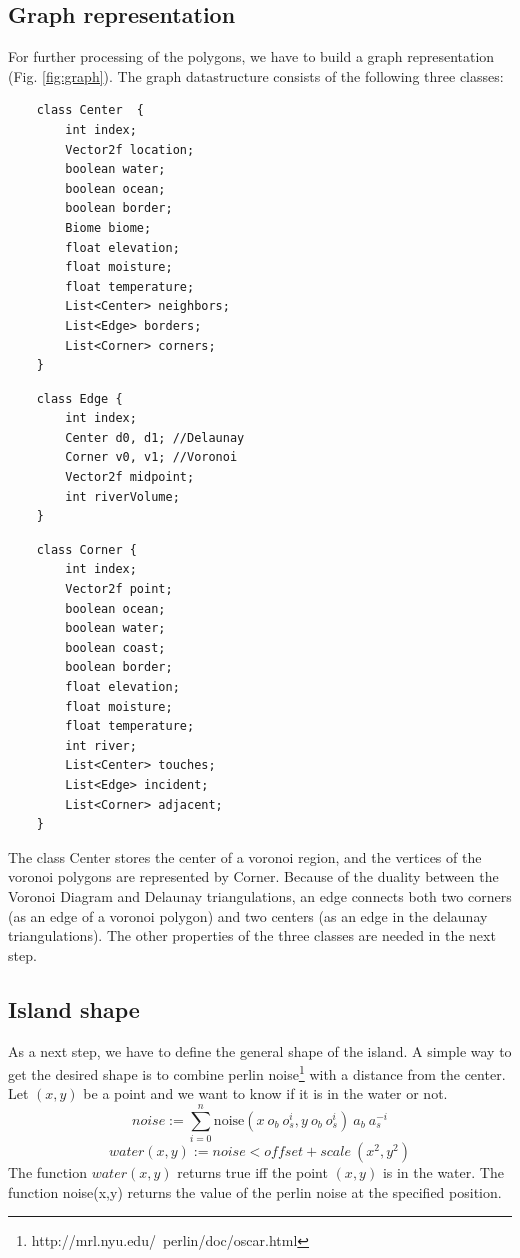 \documentclass[journal, letterpaper]{IEEEtran}
\begin{document}
\subsection{Graph representation}
For further processing of the polygons, we have to build a graph representation (Fig. \ref{fig:graph}).
The graph datastructure consists of the following three classes:
\begin{lstlisting}
	class Center  {
		int index;
		Vector2f location;
		boolean water;
		boolean ocean;
		boolean border;
		Biome biome;
		float elevation;
		float moisture;
		float temperature;
		List<Center> neighbors;
		List<Edge> borders;
		List<Corner> corners;
	}
\end{lstlisting}
\begin{lstlisting}
	class Edge {
		int index;
		Center d0, d1; //Delaunay
		Corner v0, v1; //Voronoi
		Vector2f midpoint;
		int riverVolume;
	}
\end{lstlisting}
\begin{lstlisting}
	class Corner {
		int index;
		Vector2f point;
		boolean ocean;
		boolean water;
		boolean coast;
		boolean border;
		float elevation;
		float moisture;
		float temperature;
		int river;
		List<Center> touches;
		List<Edge> incident;
		List<Corner> adjacent;
	}
\end{lstlisting}
The class Center stores the center of a voronoi region, and the vertices of the voronoi polygons are represented by Corner. Because of the duality between the Voronoi Diagram and Delaunay triangulations, an edge connects both two corners (as an edge of a voronoi polygon) and two centers (as an edge in the delaunay triangulations).
The other properties of the three classes are needed in the next step.

\subsection{Island shape}
As a next step, we have to define the general shape of the island.
A simple way to get the desired shape is to combine perlin noise\footnote{http://mrl.nyu.edu/~perlin/doc/oscar.html} with a distance from the center.
Let $(x,y)$ be a point and we want to know if it is in the water or not.
\begin{equation}
 noise := \sum_{i=0}^n{\text{noise}(x\: o_b\: o_s^i, y\: o_b\: o_s^i)\:a_b\: a_s^{-i}}
\label{eq:elevation1}
\end{equation}
\begin{equation}
	water(x,y) := noise < offset + scale\:(x^2,y^2)
\label{eq:elevation2}
\end{equation}
The function $water(x,y)$ returns true iff the point $(x,y)$ is in the water. The function noise(x,y) returns the value of the perlin noise at the specified position.
\end{document}
